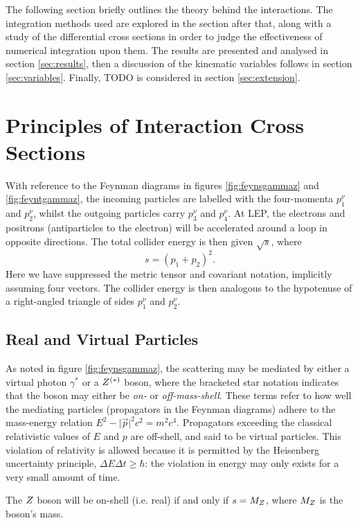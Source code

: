 \documentclass[]{article}
\begin{document}
The following section briefly outlines the theory behind the interactions. The integration methods used are explored in the section after that, along with a study of the differential cross sections in order to judge the effectiveness of numerical integration upon them. The results are presented and analysed in section \ref{sec:results}, then a discussion of the kinematic variables follows in section \ref{sec:variables}. Finally, TODO is considered in section \ref{sec:extension}.

\section{Principles of Interaction Cross Sections}

With reference to the Feynman diagrams in figures \ref{fig:feynsgammaz} and \ref{fig:feyntgammaz}, the incoming particles are labelled with the four-momenta $p_{1}^{\nu}$ and $p_{2}^{\nu}$, whilst the outgoing particles carry $p_{3}^{\nu}$ and $p_{4}^{\nu}$. At LEP, the electrons and positrons (antiparticles to the electron) will be accelerated around a loop in opposite directions. The total collider energy is then given $\sqrt{s}$, where $$s = (p_{1} + p_{2})^{2}.$$ Here we have suppressed the metric tensor and covariant notation, implicitly assuming four vectors. The collider energy is then analogous to the hypotenuse of a right-angled triangle of sides $p_{1}^{\nu}$ and $p_{2}^{\nu}$.

\subsection{Real and Virtual Particles}

As noted in figure \ref{fig:feynsgammaz}, the scattering may be mediated by either a virtual photon $\gamma^{*}$ or a $Z ^{(*)}$ boson, where the bracketed star notation indicates that the boson may either be \emph{on-} or \emph{off-mass-shell}. These terms refer to how well the mediating particles (propagators in the Feynman diagrams) adhere to the mass-energy relation $E^{2} - \lvert{\vec{p}}\rvert^{2}c^{2} = m^{2}c^{4}$. Propagators exceeding the classical relativistic values of $E$ and $p$ are off-shell, and said to be virtual particles. This violation of relativity is allowed because it is permitted by the Heisenberg uncertainty principle, $\Delta E\Delta t \geq \hbar$: the violation in energy may only exists for a very small amount of time.

The $Z $ boson will be on-shell (i.e. real) if and only if $s = M_{Z }$, where $M_{Z }$ is the boson's mass.
\end{document}
